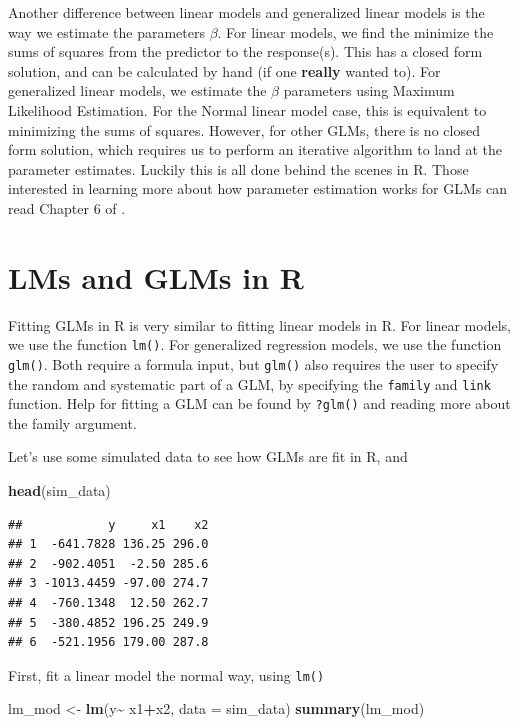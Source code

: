 \documentclass[
]{book}
\newenvironment{Shaded}{\begin{snugshade}}{\end{snugshade}}
\newcommand{\DataTypeTok}[1]{\textcolor[rgb]{0.13,0.29,0.53}{#1}}
\newcommand{\KeywordTok}[1]{\textcolor[rgb]{0.13,0.29,0.53}{\textbf{#1}}}
\newcommand{\NormalTok}[1]{#1}
\newcommand{\OperatorTok}[1]{\textcolor[rgb]{0.81,0.36,0.00}{\textbf{#1}}}
\newcommand{\StringTok}[1]{\textcolor[rgb]{0.31,0.60,0.02}{#1}}
\begin{document}
Another difference between linear models and generalized linear models is the way we estimate the parameters \(\beta\). For linear models, we find the minimize the sums of squares from the predictor to the response(s). This has a closed form solution, and can be calculated by hand (if one \textbf{really} wanted to). For generalized linear models, we estimate the \(\beta\) parameters using Maximum Likelihood Estimation. For the Normal linear model case, this is equivalent to minimizing the sums of squares. However, for other GLMs, there is no closed form solution, which requires us to perform an iterative algorithm to land at the parameter estimates. Luckily this is all done behind the scenes in R. Those interested in learning more about how parameter estimation works for GLMs can read Chapter 6 of \citep{dunn2018generalized}.

\hypertarget{lms-and-glms-in-r}{%
\section{LMs and GLMs in R}\label{lms-and-glms-in-r}}

Fitting GLMs in R is very similar to fitting linear models in R. For linear models, we use the function \texttt{lm()}. For generalized regression models, we use the function \texttt{glm()}. Both require a formula input, but \texttt{glm()} also requires the user to specify the random and systematic part of a GLM, by specifying the \texttt{family} and \texttt{link} function. Help for fitting a GLM can be found by \texttt{?glm()} and reading more about the family argument.

Let's use some simulated data to see how GLMs are fit in R, and

\begin{Shaded}
\begin{Highlighting}[]
\KeywordTok{head}\NormalTok{(sim\_data)}
\end{Highlighting}
\end{Shaded}

\begin{verbatim}
##            y     x1    x2
## 1  -641.7828 136.25 296.0
## 2  -902.4051  -2.50 285.6
## 3 -1013.4459 -97.00 274.7
## 4  -760.1348  12.50 262.7
## 5  -380.4852 196.25 249.9
## 6  -521.1956 179.00 287.8
\end{verbatim}

First, fit a linear model the normal way, using \texttt{lm()}

\begin{Shaded}
\begin{Highlighting}[]
\NormalTok{lm\_mod \textless{}{-}}\StringTok{ }\KeywordTok{lm}\NormalTok{(y}\OperatorTok{\textasciitilde{}}\StringTok{ }\NormalTok{x1}\OperatorTok{+}\NormalTok{x2, }\DataTypeTok{data =}\NormalTok{ sim\_data)}
\KeywordTok{summary}\NormalTok{(lm\_mod)}
\end{Highlighting}
\end{Shaded}
\end{document}
